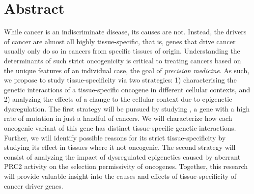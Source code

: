 \chapter{Abstract}
\normalsize

While cancer is an indiscriminate disease, its causes are not. 
Instead, the drivers of cancer are almost all highly tissue-specific, that is, genes that drive cancer usually only do so in cancers from specific tissues of origin.
Understanding the determinants of such strict oncogenicity is critical to treating cancers based on the unique features of an individual case, the goal of \emph{precision medicine}.
As such, we propose to study tissue-specificity via two strategies: 1) characterising the genetic interactions of a tissue-specific oncogene in different cellular contexts, and 2) analyzing the effects of a change to the cellular context due to epigenetic dysregulation.
The first strategy will be pursued by studying \KRAS{}, a gene with a high rate of mutation in just a handful of cancers.
We will characterize how each oncogenic variant of this gene has distinct tissue-specific genetic interactions.
Further, we will identify possible reasons for its strict tissue-specificity by studying its effect in tissues where it not oncogenic.
The second strategy will consist of analyzing the impact of dysregulated epigenetics caused by aberrant PRC2 activity on the selection permissivity of oncogenes.
Together, this research will provide valuable insight into the causes and effects of tissue-specificity of cancer driver genes.
